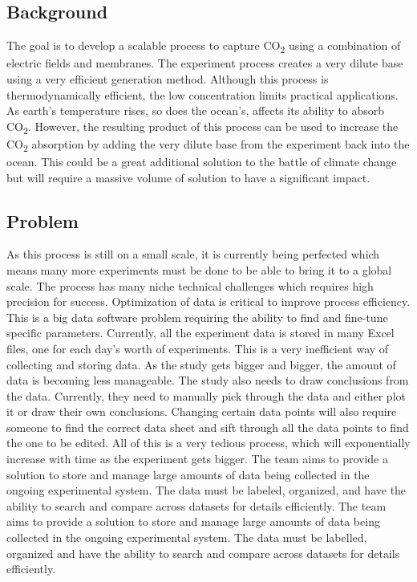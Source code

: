 \documentclass{article}
\begin{document}
\subsection{Background}
The goal is to develop a scalable process to capture CO\textsubscript{2} using a
combination of electric fields and membranes. The experiment process creates a
very dilute base using a very efficient generation method. Although this process
is thermodynamically efficient, the low concentration limits practical
applications. As earth's temperature rises, so does the ocean's, affects its
ability to absorb CO\textsubscript{2}. However, the resulting product of this
process can be used to increase the CO\textsubscript{2} absorption by adding the
very dilute base from the experiment back into the ocean. This could be a great
additional solution to the battle of climate change but will require a massive
volume of solution to have a significant impact.

\subsection{Problem}
As this process is still on a small scale, it is currently being perfected which
means many more experiments must be done to be able to bring it to a global
scale. The process has many niche technical challenges which requires high
precision for success. Optimization of data is critical to improve process
efficiency. This is a big data software problem requiring the ability to find
and fine-tune specific parameters. \newline \newline
Currently, all the experiment data is stored in many Excel files, one for each
day's worth of experiments. This is a very inefficient way of collecting and
storing data. As the study gets bigger and bigger, the amount of data is
becoming less manageable. The study also needs to draw conclusions from the
data. Currently, they need to manually pick through the data and either plot it
or draw their own conclusions. Changing certain data points will also require
someone to find the correct data sheet and sift through all the data points to
find the one to be edited. All of this is a very tedious process, which will
exponentially increase with time as the experiment gets bigger. The team aims to
provide a solution to store and manage large amounts of data being collected in
the ongoing experimental system. The data must be labeled, organized, and have
the ability to search and compare across datasets for details efficiently.
The team aims to provide a solution to store and manage large amounts of data
being collected in the ongoing experimental system. The data must be labelled,
organized and have the ability to search and compare across datasets for details
efficiently.
\end{document}
